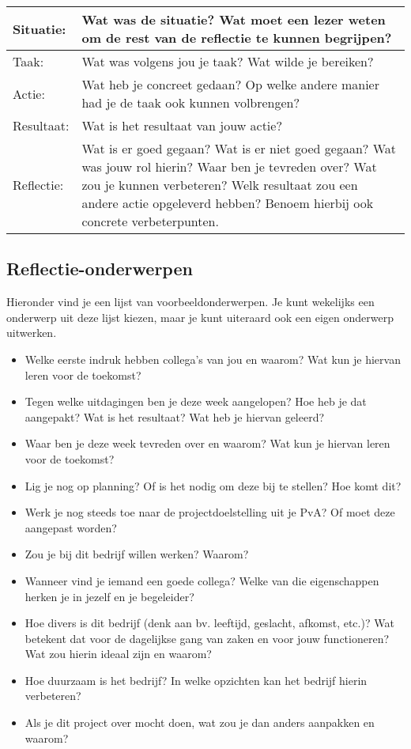 \documentclass[a4paper,12pt]{article}
\begin{document}
\begin{longtable}{|l|p{}|}
\hline
Situatie:   & Wat was de situatie? Wat moet een lezer weten om de rest van de reflectie te kunnen begrijpen? \\ \hline
Taak:   & Wat was volgens jou je taak? Wat wilde je bereiken?  \\ \hline
Actie:  & Wat heb je concreet gedaan? Op welke andere manier had je de taak ook kunnen volbrengen? \\ \hline
Resultaat: & Wat is het resultaat van jouw actie? \\ \hline
Reflectie:   & Wat is er goed gegaan? Wat is er niet goed gegaan? Wat was jouw rol hierin? Waar ben je tevreden over? Wat zou je kunnen verbeteren? Welk resultaat zou een andere actie opgeleverd hebben? Benoem hierbij ook concrete verbeterpunten. \\ \hline

\hline

\end{longtable}

\subsection*{Reflectie-onderwerpen}
Hieronder vind je een lijst van voorbeeldonderwerpen. Je kunt wekelijks een onderwerp uit deze lijst kiezen, maar je kunt uiteraard ook een eigen onderwerp uitwerken.

\begin{itemize}
    \item Welke eerste indruk hebben collega’s van jou en waarom? Wat kun je hiervan leren voor de toekomst?
    \item Tegen welke uitdagingen ben je deze week aangelopen? Hoe heb je dat aangepakt? Wat is het resultaat? Wat heb je hiervan geleerd?
    \item Waar ben je deze week tevreden over en waarom? Wat kun je hiervan leren voor de toekomst?
    \item Lig je nog op planning? Of is het nodig om deze bij te stellen? Hoe komt dit?
    \item Werk je nog steeds toe naar de projectdoelstelling uit je PvA? Of moet deze aangepast worden?
    \item Zou je bij dit bedrijf willen werken? Waarom?
    \item Wanneer vind je iemand een goede collega? Welke van die eigenschappen herken je in jezelf en je begeleider?
    \item Hoe divers is dit bedrijf (denk aan bv. leeftijd, geslacht, afkomst, etc.)? Wat betekent dat voor de dagelijkse gang van zaken en voor jouw functioneren? Wat zou hierin ideaal zijn en waarom?
    \item Hoe duurzaam is het bedrijf? In welke opzichten kan het bedrijf hierin verbeteren?
    \item Als je dit project over mocht doen, wat zou je dan anders aanpakken en waarom?
\end{itemize}
\end{document}
